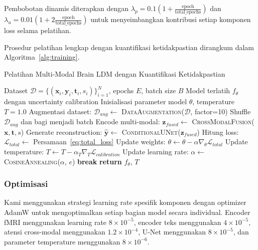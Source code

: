 Pembobotan dinamis diterapkan dengan $\lambda_p = 0.1(1 + \frac{\text{epoch}}{\text{total\_epochs}})$ dan $\lambda_u = 0.01(1 + 2\frac{\text{epoch}}{\text{total\_epochs}})$ untuk menyeimbangkan kontribusi setiap komponen loss selama pelatihan.

Prosedur pelatihan lengkap dengan kuantifikasi ketidakpastian dirangkum dalam Algoritma~\ref{alg:training}.

\begin{algorithm}[htbp]
\caption{Pelatihan Multi-Modal Brain LDM dengan Kuantifikasi Ketidakpastian}
\label{alg:training}
\begin{algorithmic}[1]
\Require Dataset $\mathcal{D} = \{(\mathbf{x}_i, \mathbf{y}_i, \mathbf{t}_i, s_i)\}_{i=1}^N$, epochs $E$, batch size $B$
\Ensure Model terlatih $f_\theta$ dengan uncertainty calibration
\State Inisialisasi parameter model $\theta$, temperature $T = 1.0$
\State Augmentasi dataset: $\mathcal{D}_{aug} \leftarrow$ \textsc{DataAugmentation}($\mathcal{D}$, factor=10)
    \State Shuffle $\mathcal{D}_{aug}$ dan bagi menjadi batch
        \State Encode multi-modal: $\mathbf{z}_{fused} \leftarrow$ \textsc{CrossModalFusion}($\mathbf{x}, \mathbf{t}, s$)
        \State Generate reconstruction: $\hat{\mathbf{y}} \leftarrow$ \textsc{ConditionalUNet}($\mathbf{z}_{fused}$)
        \State Hitung loss: $\mathcal{L}_{total} \leftarrow$ Persamaan~\ref{eq:total_loss}
        \State Update weights: $\theta \leftarrow \theta - \alpha \nabla_\theta \mathcal{L}_{total}$
        \State Update temperature: $T \leftarrow T - \alpha_T \nabla_T \mathcal{L}_{calibration}$
    \EndFor
    \State Update learning rate: $\alpha \leftarrow$ \textsc{CosineAnnealing}($\alpha$, $e$)
        \State \textbf{break} 
    \EndIf
\EndFor
\State \textbf{return} $f_\theta$, $T$
\end{algorithmic}
\end{algorithm}

\subsubsection{Optimisasi}
Kami menggunakan strategi learning rate spesifik komponen dengan optimizer AdamW untuk mengoptimalkan setiap bagian model secara individual. Encoder fMRI menggunakan learning rate $8 \times 10^{-5}$, encoder teks menggunakan $4 \times 10^{-5}$, atensi cross-modal menggunakan $1.2 \times 10^{-4}$, U-Net menggunakan $8 \times 10^{-5}$, dan parameter temperature menggunakan $8 \times 10^{-6}$.

